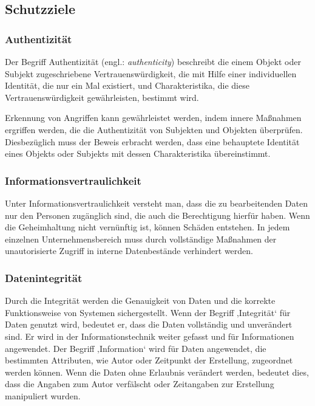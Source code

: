 \subsection{Schutzziele}

\subsubsection{Authentizität}

Der Begriff Authentizität (engl.: \textit{authenticity}) beschreibt die einem Objekt oder Subjekt zugeschriebene Vertrauenswürdigkeit, die mit Hilfe einer individuellen Identität, die nur ein Mal existiert, und Charakteristika, die diese Vertrauenswürdigkeit gewährleisten, bestimmt wird\cite[28]{eckert2013sicherheit}.

Erkennung von Angriffen kann gewährleistet werden, indem innere Maßnahmen ergriffen werden, die die Authentizität von Subjekten und Objekten überprüfen\cite[13]{spies1985datenschutz}. Diesbezüglich muss der Beweis erbracht werden, dass eine behauptete Identität eines Objekts oder Subjekts mit dessen Charakteristika übereinstimmt\cite[28]{eckert2013sicherheit}.

\subsubsection{Informationsvertraulichkeit}
Unter Informationsvertraulichkeit versteht man, dass die zu bearbeitenden Daten nur den Personen zugänglich sind, die auch die Berechtigung hierfür haben. Wenn die Geheimhaltung nicht vernünftig ist, können Schäden entstehen. In jedem einzelnen Unternehmensbereich muss durch vollständige Maßnahmen der unautorisierte Zugriff in interne Datenbestände verhindert werden\cite[205]{gora2003handbuch}.

\subsubsection{Datenintegrität}

Durch die Integrität werden die Genauigkeit von Daten und die korrekte Funktionsweise von Systemen sichergestellt. Wenn der Begriff ‚Integrität‘ für Daten genutzt wird, bedeutet er, dass die Daten vollständig und unverändert sind. Er wird in der Informationstechnik weiter gefasst und für Informationen angewendet. Der Begriff ‚Information‘ wird für Daten angewendet, die bestimmten Attributen, wie Autor oder Zeitpunkt der Erstellung, zugeordnet werden können. Wenn die Daten ohne Erlaubnis verändert werden, bedeutet dies, dass die Angaben zum Autor verfälscht oder Zeitangaben zur Erstellung manipuliert wurden\cite{dtint2007}.

